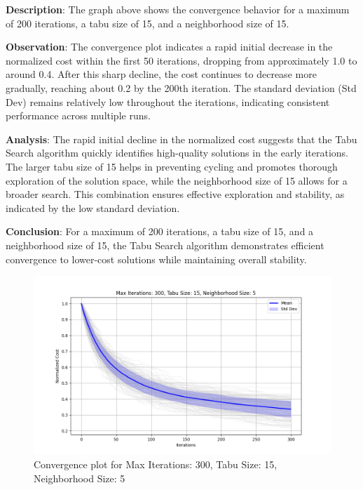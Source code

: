 \documentclass[
]{article}
\begin{document}
    \textbf{Description}: The graph above shows the convergence behavior for a maximum of 200 iterations, a tabu size of 15, and a neighborhood size of 15.

    \textbf{Observation}: The convergence plot indicates a rapid initial decrease in the normalized cost within the first 50 iterations, dropping from approximately 1.0 to around 0.4. After this sharp decline, the cost continues to decrease more gradually, reaching about 0.2 by the 200th iteration. The standard deviation (Std Dev) remains relatively low throughout the iterations, indicating consistent performance across multiple runs.

    \textbf{Analysis}: The rapid initial decline in the normalized cost suggests that the Tabu Search algorithm quickly identifies high-quality solutions in the early iterations. The larger tabu size of 15 helps in preventing cycling and promotes thorough exploration of the solution space, while the neighborhood size of 15 allows for a broader search. This combination ensures effective exploration and stability, as indicated by the low standard deviation.

    \textbf{Conclusion}: For a maximum of 200 iterations, a tabu size of 15, and a neighborhood size of 15, the Tabu Search algorithm demonstrates efficient convergence to lower-cost solutions while maintaining overall stability.

    \begin{figure}[H]
        \centering
        \includegraphics[width=\textwidth]{tabu_search/max_iter_300_tabu_size_15_neighborhood_size_5}
        \caption{Convergence plot for Max Iterations: 300, Tabu Size: 15, Neighborhood Size: 5}
        \label{fig:ts_300_15_5}
    \end{figure}
\end{document}
